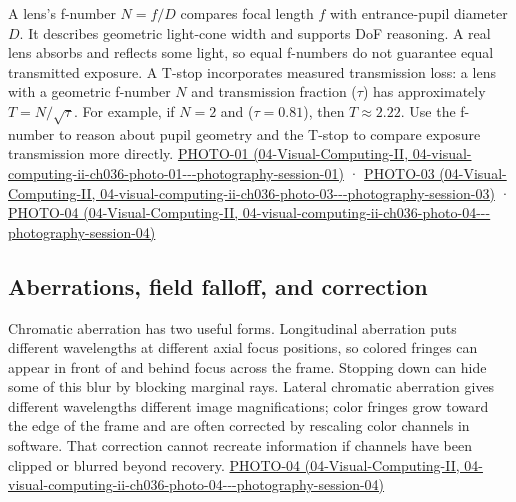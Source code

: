 A lens's f-number \(N=f/D\) compares focal length \(f\) with entrance-pupil diameter \(D\). It describes geometric light-cone width and supports DoF reasoning. A real lens absorbs and reflects some light, so equal f-numbers do not guarantee equal transmitted exposure. A T-stop incorporates measured transmission loss: a lens with a geometric f-number \(N\) and transmission fraction (\(\tau\)) has approximately \(T=N/\sqrt{\tau}\). For example, if \(N=2\) and (\(\tau=0.81\)), then \(T\approx2.22\). Use the f-number to reason about pupil geometry and the T-stop to compare exposure transmission more directly. \href{../04-Visual-Computing-II/main.pdf\#nameddest=04-visual-computing-ii-ch036-photo-01---photography-session-01}{PHOTO-01 (04-Visual-Computing-II, 04-visual-computing-ii-ch036-photo-01-\/-\/-photography-session-01)} · \href{../04-Visual-Computing-II/main.pdf\#nameddest=04-visual-computing-ii-ch036-photo-03---photography-session-03}{PHOTO-03 (04-Visual-Computing-II, 04-visual-computing-ii-ch036-photo-03-\/-\/-photography-session-03)} · \href{../04-Visual-Computing-II/main.pdf\#nameddest=04-visual-computing-ii-ch036-photo-04---photography-session-04}{PHOTO-04 (04-Visual-Computing-II, 04-visual-computing-ii-ch036-photo-04-\/-\/-photography-session-04)}

\subsection{Aberrations, field falloff, and correction}\label{03-visual-computing-i-ch003-aberrations-field-falloff-and-correction}

Chromatic aberration has two useful forms. Longitudinal aberration puts different wavelengths at different axial focus positions, so colored fringes can appear in front of and behind focus across the frame. Stopping down can hide some of this blur by blocking marginal rays. Lateral chromatic aberration gives different wavelengths different image magnifications; color fringes grow toward the edge of the frame and are often corrected by rescaling color channels in software. That correction cannot recreate information if channels have been clipped or blurred beyond recovery. \href{../04-Visual-Computing-II/main.pdf\#nameddest=04-visual-computing-ii-ch036-photo-04---photography-session-04}{PHOTO-04 (04-Visual-Computing-II, 04-visual-computing-ii-ch036-photo-04-\/-\/-photography-session-04)}

